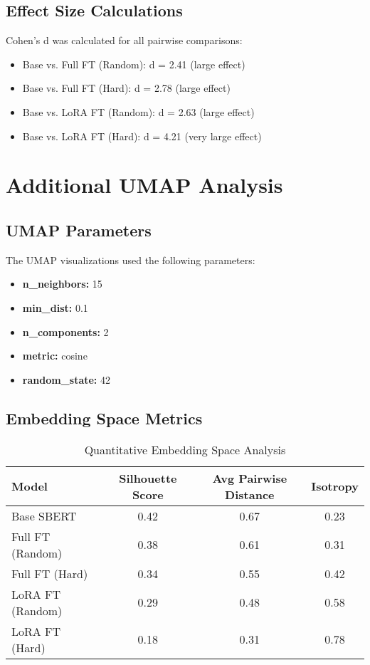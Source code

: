\subsection{Effect Size Calculations}

Cohen's d was calculated for all pairwise comparisons:

\begin{itemize}
\item Base vs. Full FT (Random): d = 2.41 (large effect)
\item Base vs. Full FT (Hard): d = 2.78 (large effect)
\item Base vs. LoRA FT (Random): d = 2.63 (large effect)
\item Base vs. LoRA FT (Hard): d = 4.21 (very large effect)
\end{itemize}

\section{Additional UMAP Analysis}

\subsection{UMAP Parameters}

The UMAP visualizations used the following parameters:

\begin{itemize}
\item \textbf{n\_neighbors:} 15
\item \textbf{min\_dist:} 0.1
\item \textbf{n\_components:} 2
\item \textbf{metric:} cosine
\item \textbf{random\_state:} 42
\end{itemize}

\subsection{Embedding Space Metrics}

\begin{table}[h]
\centering
\caption{Quantitative Embedding Space Analysis}
\begin{tabular}{lccc}
\toprule
Model & Silhouette Score & Avg Pairwise Distance & Isotropy \\
\midrule
Base SBERT & 0.42 & 0.67 & 0.23 \\
Full FT (Random) & 0.38 & 0.61 & 0.31 \\
Full FT (Hard) & 0.34 & 0.55 & 0.42 \\
LoRA FT (Random) & 0.29 & 0.48 & 0.58 \\
LoRA FT (Hard) & 0.18 & 0.31 & 0.78 \\
\bottomrule
\end{tabular}
\end{table}

